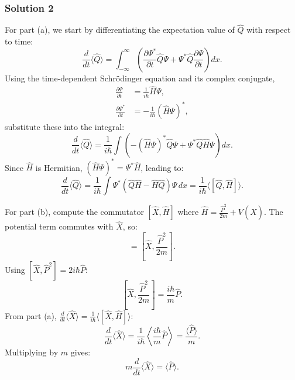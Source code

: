 \documentclass{article}
\begin{document}
\subsubsection{Solution 2}
For part (a), we start by differentiating the expectation value of $\hat{Q}$ with respect to time:
\begin{equation}
\frac{d}{dt} \langle \hat{Q} \rangle = \int_{-\infty}^\infty \left( \frac{\partial \Psi^*}{\partial t} \hat{Q} \Psi + \Psi^* \hat{Q} \frac{\partial \Psi}{\partial t} \right) dx.
\end{equation}
Using the time-dependent Schrödinger equation and its complex conjugate,
\begin{align}
\frac{\partial \Psi}{\partial t} &= \frac{1}{i\hbar} \hat{H} \Psi, \\
\frac{\partial \Psi^*}{\partial t} &= -\frac{1}{i\hbar} (\hat{H} \Psi)^*,
\end{align}
substitute these into the integral:
\begin{equation}
\frac{d}{dt} \langle \hat{Q} \rangle = \frac{1}{i\hbar} \int \left( -(\hat{H} \Psi)^* \hat{Q} \Psi + \Psi^* \hat{Q} \hat{H} \Psi \right) dx.
\end{equation}
Since $\hat{H}$ is Hermitian, $(\hat{H} \Psi)^* = \Psi^* \hat{H}$, leading to:
\begin{equation}
\frac{d}{dt} \langle \hat{Q} \rangle = \frac{1}{i\hbar} \int \Psi^* \left( \hat{Q} \hat{H} - \hat{H} \hat{Q} \right) \Psi \, dx = \frac{1}{i\hbar} \langle [\hat{Q}, \hat{H}] \rangle.
\end{equation}

For part (b), compute the commutator $[\hat{X}, \hat{H}]$ where $\hat{H} = \frac{\hat{P}^2}{2m} + V(\hat{X})$. The potential term commutes with $\hat{X}$, so:
\begin{equation}
[\hat{X}, \hat{H}] = \left[\hat{X}, \frac{\hat{P}^2}{2m}\right].
\end{equation}
Using $[\hat{X}, \hat{P}^2] = 2i\hbar \hat{P}$:
\begin{equation}
\left[\hat{X}, \frac{\hat{P}^2}{2m}\right] = \frac{i\hbar}{m} \hat{P}.
\end{equation}
From part (a), $\frac{d}{dt} \langle \hat{X} \rangle = \frac{1}{i\hbar} \langle [\hat{X}, \hat{H}] \rangle$:
\begin{equation}
\frac{d}{dt} \langle \hat{X} \rangle = \frac{1}{i\hbar} \left\langle \frac{i\hbar}{m} \hat{P} \right\rangle = \frac{\langle \hat{P} \rangle}{m}.
\end{equation}
Multiplying by $m$ gives:
\begin{equation}
m \frac{d}{dt} \langle \hat{X} \rangle = \langle \hat{P} \rangle.
\end{equation}
\end{document}

